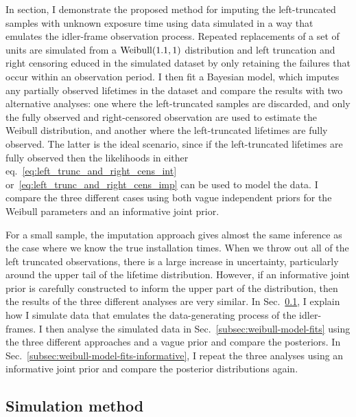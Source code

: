 In section, I demonstrate the proposed method for imputing the left-truncated samples with unknown exposure time using data simulated in a way that emulates the idler-frame observation process. Repeated replacements of a set of units are simulated from a $\hbox{Weibull}(1.1, 1)$ distribution and left truncation and right censoring educed in the simulated dataset by only retaining the failures that occur within an observation period. I then fit a Bayesian model, which imputes any partially observed lifetimes in the dataset and compare the results with two alternative analyses: one where the left-truncated samples are discarded, and only the fully observed and right-censored observation are used to estimate the Weibull distribution, and another where the left-truncated lifetimes are fully observed. The latter is the ideal scenario, since if the left-truncated lifetimes are fully observed then the likelihoods in either eq.~\eqref{eq:left_trunc_and_right_cens_int} or~\eqref{eq:left_trunc_and_right_cens_imp} can be used to model the data. I compare the three different cases using both vague independent priors for the Weibull parameters and an informative joint prior.

For a small sample, the imputation approach gives almost the same inference as the case where we know the true installation times. When we throw out all of the left truncated observations, there is a large increase in uncertainty, particularly around the upper tail of the lifetime distribution. However, if an informative joint prior is carefully constructed to inform the upper part of the distribution, then the results of the three different analyses are very similar. In Sec.~\ref{subsec:sim-method-weibull}, I explain how I simulate data that emulates the data-generating process of the idler-frames. I then analyse the simulated data in Sec.~\ref{subsec:weibull-model-fits} using the three different approaches and a vague prior and compare the posteriors. In Sec.~\ref{subsec:weibull-model-fits-informative}, I repeat the three analyses using an informative joint prior and compare the posterior distributions again.

\subsection{Simulation method} \label{subsec:sim-method-weibull}

